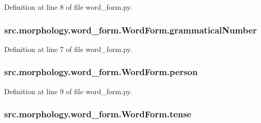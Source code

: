 Definition at line 8 of file word\+\_\+form.\+py.

\hypertarget{classsrc_1_1morphology_1_1word__form_1_1_word_form_affc0a3ba96904019be2b92d55e832bcb}{
\subsubsection[{grammatical\+Number}]{\setlength{\rightskip}{0pt plus 5cm}src.\+morphology.\+word\+\_\+form.\+Word\+Form.\+grammatical\+Number}}\label{classsrc_1_1morphology_1_1word__form_1_1_word_form_affc0a3ba96904019be2b92d55e832bcb}


Definition at line 7 of file word\+\_\+form.\+py.

\hypertarget{classsrc_1_1morphology_1_1word__form_1_1_word_form_a8c2487c9b360cc067bcb40ee7cf8d8c5}{
\subsubsection[{person}]{\setlength{\rightskip}{0pt plus 5cm}src.\+morphology.\+word\+\_\+form.\+Word\+Form.\+person}}\label{classsrc_1_1morphology_1_1word__form_1_1_word_form_a8c2487c9b360cc067bcb40ee7cf8d8c5}


Definition at line 9 of file word\+\_\+form.\+py.

\hypertarget{classsrc_1_1morphology_1_1word__form_1_1_word_form_a1436b5d9574c2a0096b46fa607424576}{
\subsubsection[{tense}]{\setlength{\rightskip}{0pt plus 5cm}src.\+morphology.\+word\+\_\+form.\+Word\+Form.\+tense}}\label{classsrc_1_1morphology_1_1word__form_1_1_word_form_a1436b5d9574c2a0096b46fa607424576}


